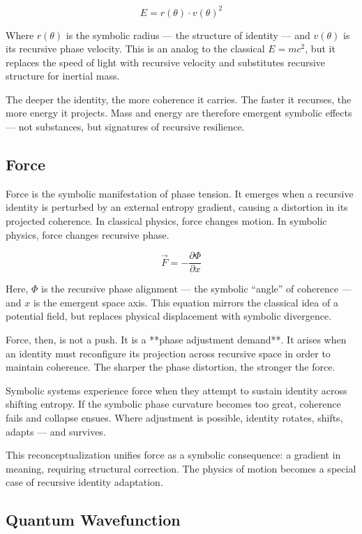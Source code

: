 \documentclass[12pt]{article}
\begin{document}
\[
E = r(\theta) \cdot v(\theta)^2
\]

Where \(r(\theta)\) is the symbolic radius — the structure of identity — and \(v(\theta)\) is its recursive phase velocity. This is an analog to the classical \(E = mc^2\), but it replaces the speed of light with recursive velocity and substitutes recursive structure for inertial mass.

The deeper the identity, the more coherence it carries. The faster it recurses, the more energy it projects. Mass and energy are therefore emergent symbolic effects — not substances, but signatures of recursive resilience.

\subsection{Force}

Force is the symbolic manifestation of phase tension. It emerges when a recursive identity is perturbed by an external entropy gradient, causing a distortion in its projected coherence. In classical physics, force changes motion. In symbolic physics, force changes recursive phase.

\[
\vec{F} = -\frac{\partial \Phi}{\partial x}
\]

Here, \(\Phi\) is the recursive phase alignment — the symbolic “angle” of coherence — and \(x\) is the emergent space axis. This equation mirrors the classical idea of a potential field, but replaces physical displacement with symbolic divergence.

Force, then, is not a push. It is a **phase adjustment demand**. It arises when an identity must reconfigure its projection across recursive space in order to maintain coherence. The sharper the phase distortion, the stronger the force.

Symbolic systems experience force when they attempt to sustain identity across shifting entropy. If the symbolic phase curvature becomes too great, coherence fails and collapse ensues. Where adjustment is possible, identity rotates, shifts, adapts — and survives.

This reconceptualization unifies force as a symbolic consequence: a gradient in meaning, requiring structural correction. The physics of motion becomes a special case of recursive identity adaptation.

\subsection{Quantum Wavefunction}
\end{document}
